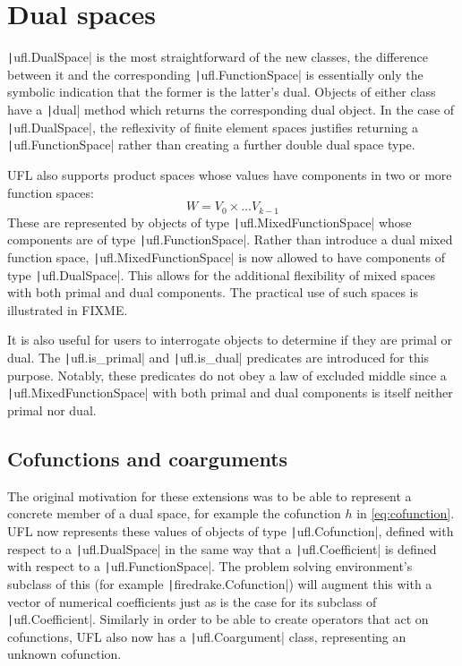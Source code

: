 \documentclass[a4paper,11pt]{article}
\begin{document}
\section{Dual spaces}

\texttt|ufl.DualSpace| is the most straightforward of the new classes, the difference between it and the corresponding \texttt|ufl.FunctionSpace| is essentially only the symbolic indication that the former is the latter's dual. Objects of either class have a \texttt|dual| method which returns the corresponding dual object. In the case of \texttt|ufl.DualSpace|, the reflexivity of finite element spaces justifies returning a \texttt|ufl.FunctionSpace| rather than creating a further double dual space type.

UFL also supports product spaces whose values have components in two or more function spaces:
\begin{equation}
    W = V_0 \times \ldots V_{k-1}     
\end{equation}
These are represented by objects of type \texttt|ufl.MixedFunctionSpace| whose components are of type \texttt|ufl.FunctionSpace|. Rather than introduce a dual mixed function space, \texttt|ufl.MixedFunctionSpace| is now allowed to have components of type \texttt|ufl.DualSpace|. This allows for the additional flexibility of mixed spaces with both primal and dual components. The practical use of such spaces is illustrated in FIXME. 

It is also useful for users to interrogate objects to determine if they are primal or dual. The \texttt|ufl.is_primal| and \texttt|ufl.is_dual| predicates are introduced for this purpose. Notably, these predicates do not obey a law of excluded middle since a \texttt|ufl.MixedFunctionSpace| with both primal and dual components is itself neither primal nor dual.

\subsection{Cofunctions and coarguments}

The original motivation for these extensions was to be able to represent a concrete member of a dual space, for example the cofunction $h$ in \eqref{eq:cofunction}. UFL now represents these values of objects of type \texttt|ufl.Cofunction|, defined with respect to a \texttt|ufl.DualSpace| in the same way that a \texttt|ufl.Coefficient| is defined with respect to a \texttt|ufl.FunctionSpace|. The problem solving environment's subclass of this (for example \texttt|firedrake.Cofunction|) will augment this with a vector of numerical coefficients just as is the case for its subclass of \texttt|ufl.Coefficient|. Similarly in order to be able to create operators that act on cofunctions, UFL also now has a \texttt|ufl.Coargument| class, representing an unknown cofunction.
\end{document}
